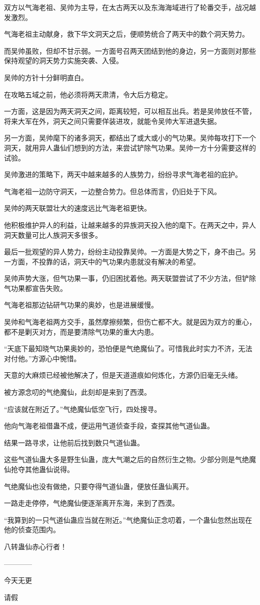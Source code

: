 \begin{this_body}
双方以气海老祖、吴帅为主导，在太古两天以及东海海域进行了轮番交手，战况越发激烈。

气海老祖主动献身，救下华文洞天之后，便顺势统合了两天中的数个洞天势力。

而吴帅虽败，但却不甘示弱。一方面号召两天团结到他的身边，另一方面则对那些保持观望的洞天势力实施突袭、入侵。

吴帅的方针十分鲜明直白。

在攻略五域之前，他必须将两天肃清，令大后方稳定。

一方面，这是因为两天洞天之间，距离较短，可以相互出兵。若是吴帅放任不管，将来大军在外，洞天之间只需要佯装进攻，就能令吴帅大军进退失据。

另一方面，吴帅麾下的诸多洞天，都结出了或大或小的气功果。吴帅每攻打下一个洞天，就用异人蛊仙们想到的方法，来尝试铲除气功果。吴帅一方十分需要这样的试验。

吴帅激进的策略下，两天中越来越多的人族势力，纷纷寻求气海老祖的庇护。

气海老祖一边防守洞天，一边整合势力。但总体而言，仍旧处于下风。

吴帅的两天联盟壮大的速度远比气海老祖更快。

他积极维护异人的利益，让越来越多的异族洞天投入他的麾下。在两天之中，异人洞天数量可比人族洞天多很多。

最后一批观望的异人势力，纷纷主动投靠吴帅。一方面是大势之下，身不由己。另一方面，不投靠的话，洞天中的气功果内患就没有解决的希望。

吴帅声势大涨，但气功果一事，仍旧困扰着他。两天联盟尝试了不少方法，但铲除气功果都宣告失败。

气海老祖那边钻研气功果的奥妙，也是进展缓慢。

吴帅和气海老祖两方交手，虽然摩擦频繁，但伤亡都不大。就是因为双方的重心，都不是剿灭对方，而是要清除气功果的重大内患。

“天底下最知晓气功果奥妙的，恐怕便是气绝魔仙了。可惜我此时实力不济，无法对付他。”方源心中惋惜。

天意的大麻烦已经被他解决了，但是天道道痕如何炼化，方源仍旧毫无头绪。

被方源念叨的气绝魔仙，此刻却是来到了西漠。

“应该就在附近了。”气绝魔仙低空飞行，四处搜寻。

他向气海老祖借蛊不成，便运用气道侦查手段，查探其他气道仙蛊。

结果一路寻求，让他前后找到数只气道仙蛊。

这些气道仙蛊大多是野生仙蛊，庞大气潮之后的自然衍生之物。少部分则是气绝魔仙抢夺其他蛊仙说得。

气绝魔仙也没有做绝，只要夺得气道仙蛊，便放任蛊仙离开。

一路走走停停，气绝魔仙便逐渐离开东海，来到了西漠。

“我算到的一只气道仙蛊应当就在附近。”气绝魔仙正念叨着，一个蛊仙忽然出现在他的侦查范围内。

八转蛊仙赤心行者！

------------

今天无更

请假

\end{this_body}

